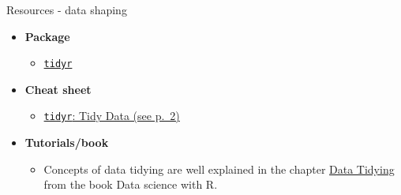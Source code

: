 \documentclass[8pt,ignorenonframetext,]{beamer}
\providecommand{\tightlist}{%
  \setlength{\itemsep}{0pt}\setlength{\parskip}{0pt}}
\begin{document}
\begin{frame}[fragile]{Resources - data shaping}

\begin{itemize}
\tightlist
\item
  \textbf{Package}

  \begin{itemize}
  \tightlist
  \item
    \href{https://cran.r-project.org/web/packages/tidyr/index.html}{\texttt{tidyr}}
  \end{itemize}
\item
  \textbf{Cheat sheet}

  \begin{itemize}
  \tightlist
  \item
    \href{https://github.com/rstudio/cheatsheets/raw/master/data-import.pdf}{\texttt{tidyr}:
    Tidy Data (see p.~2)}
  \end{itemize}
\item
  \textbf{Tutorials/book}

  \begin{itemize}
  \tightlist
  \item
    Concepts of data tidying are well explained in the chapter
    \href{http://garrettgman.github.io/tidying/}{Data Tidying} from the
    book Data science with R.
  \end{itemize}
\end{itemize}

\end{frame}
\end{document}
